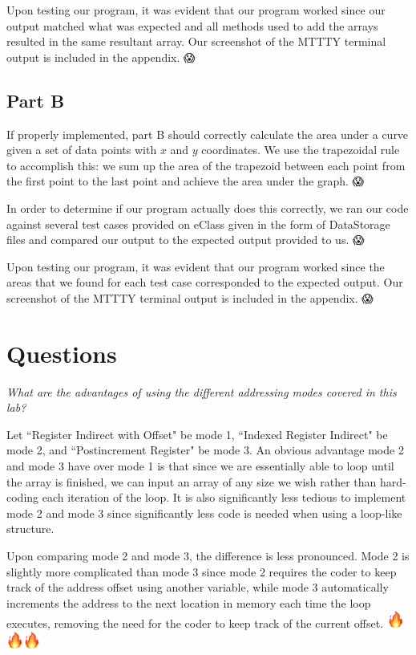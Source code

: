 \documentclass[10pt, letterpaper, titlepage]{article} %
\newcommand*\fire{\includegraphics[height=1.5em,valign=B,raise=-0.2em]{Fire.png}}
\begin{document}
\begin{multicols*}{2}
Upon testing our program, it was evident that our program worked since our output matched what was expected and all methods used to add the arrays resulted in the same resultant array. Our screenshot of the MTTTY terminal output is included in the appendix. 😱

\subsection{Part B}
If properly implemented, part B should correctly calculate the area under a curve given a set of data points with $x$ and $y$ coordinates. We use the trapezoidal rule to accomplish this: we sum up the area of the trapezoid between each point from the first point to the last point and achieve the area under the graph. 😱

In order to determine if our program actually does this correctly, we ran our code against several test cases provided on eClass given in the form of DataStorage files and compared our output to the expected output provided to us. 😱 

Upon testing our program, it was evident that our program worked since the areas that we found for each test case corresponded to the expected output. Our screenshot of the MTTTY terminal output is included in the appendix. 😱

\section{Questions}
\textit{What are the advantages of using the different addressing modes covered in this lab?}

Let ``Register Indirect with Offset" be mode 1, ``Indexed Register Indirect" be mode 2, and ``Postincrement Register" be mode 3. 
An obvious advantage mode 2 and mode 3 have over mode 1 is that since we are essentially able to loop until the array is finished, we can input an array of any size we wish rather than hard-coding each iteration of the loop. 
It is also significantly less tedious to implement mode 2 and mode 3 since significantly less code is needed when using a loop-like structure. 

Upon comparing mode 2 and mode 3, the difference is less pronounced. 
Mode 2 is slightly more complicated than mode 3 since mode 2 requires the coder to keep track of the address offset using another variable, while mode 3 automatically increments the address to the next location in memory each time the loop executes, removing the need for the coder to keep track of the current offset. \fire \fire \fire


\end{multicols*}
\end{document}
